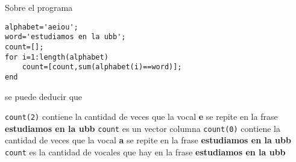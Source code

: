 \begin{pregunta}
\begin{cuerpo}
Sobre el programa
\begin{lstlisting}
alphabet='aeiou';
word='estudiamos en la ubb';
count=[];
for i=1:length(alphabet)
    count=[count,sum(alphabet(i)==word)];
end
\end{lstlisting}
se puede deducir que
\end{cuerpo}
\begin{alternativas}
{\texttt{count(2)} contiene la cantidad de veces que la vocal \textbf{e} se repite en la frase \textbf{estudiamos en la ubb}}
{\texttt{count} es un vector columna}
{\texttt{count(0)} contiene la cantidad de veces que la vocal \textbf{a} se repite en la frase \textbf{estudiamos en la ubb}}
{\texttt{count} es la cantidad de vocales que hay en la frase \textbf{estudiamos en la ubb}}
\end{alternativas}
\justificacion{0cm}
\end{pregunta}